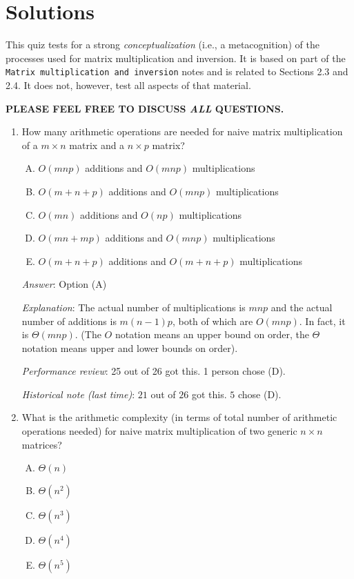 \documentclass[10pt]{amsart}
\begin{document}
\section{Solutions}
This quiz tests for a strong {\em conceptualization} (i.e., a
metacognition) of the processes used for matrix multiplication and
inversion. It is based on part of the {\tt Matrix multiplication and
  inversion} notes and is related to Sections 2.3 and 2.4. It does
not, however, test all aspects of that material.

{\bf PLEASE FEEL FREE TO DISCUSS {\em ALL} QUESTIONS.}

\begin{enumerate}
\item How many arithmetic operations are needed for naive matrix
  multiplication of a $m \times n$ matrix and a $n \times p$ matrix?

  \begin{enumerate}[(A)]
  \item $O(mnp)$ additions and $O(mnp)$ multiplications
  \item $O(m + n + p)$ additions and $O(mnp)$ multiplications
  \item $O(mn)$ additions and $O(np)$ multiplications
  \item $O(mn + mp)$ additions and $O(mnp)$ multiplications
  \item $O(m + n + p)$ additions and $O(m + n + p)$ multiplications
  \end{enumerate}

  {\em Answer}: Option (A)

  {\em Explanation}: The actual number of multiplications is $mnp$ and
  the actual number of additions is $m(n - 1)p$, both of which are
  $O(mnp)$. In fact, it is $\Theta(mnp)$. (The $O$ notation means an
  upper bound on order, the $\Theta$ notation means upper and lower
  bounds on order).

  {\em Performance review}: 25 out of 26 got this. 1 person chose (D).

  {\em Historical note (last time)}: $21$ out of $26$ got this. $5$ chose (D).

\item What is the arithmetic complexity (in terms of total number of
  arithmetic operations needed) for naive matrix multiplication of two
  generic $n \times n$ matrices?

  \begin{enumerate}[(A)]
  \item $\Theta(n)$
  \item $\Theta(n^2)$
  \item $\Theta(n^3)$
  \item $\Theta(n^4)$
  \item $\Theta(n^5)$
  \end{enumerate}


\end{enumerate}
\end{document}
